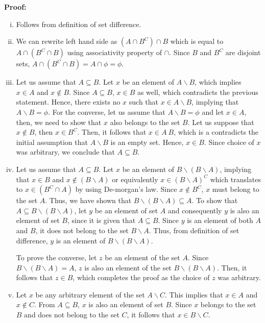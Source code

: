 \documentclass[a4paper,english,12pt]{article}
\begin{document}
\textbf{Proof: }
\begin{enumerate} [i)]
 \item Follows from definition of set difference.
 \item We can rewrite left hand side as $(A \cap B^{C}) \cap B$ which is equal to 
 $A \cap (B^{C} \cap B)$ using associativity property of $\cap$. Since $B$ and $B^{C}$ are disjoint sets, $A \cap (B^{C} \cap B) = A \cap \phi = \phi$. 
 \item Let us assume that $A \subseteq B$. Let $x$ be an element of $A \backslash B$, which implies $x \in A$ and $x \notin B$. Since $A \subseteq B$, $x \in B$ as well, which contradicts the previous  statement. Hence, there exists no $x$ such that $x \in A \backslash B$, implying that $A \backslash B = \phi$.  For the converse, let us assume that $A \backslash B = \phi$ and let $x \in A$, then, we need to show that $x$ also belongs to the set $B$. Let us suppose that $x \notin B$, then $x \in B^{C}$. Then, it follows that $x \in A \ B$, which is a contradicts the initial assumption that 
 $A \backslash B$ is an empty set. Hence, $x \in B$. Since choice of $x$ was arbitrary, we conclude that $A \subseteq B$.    
 \item Let us assume that $A \subseteq B$. Let $x$ be an element of $B \backslash (B \backslash A)$, implying that $x \in B$ and $x \notin (B \backslash A)$ or equivalently $x \in (B \backslash A)^{C}$
 which translates to $x \in (B^{C} \cap A)$ by using De-morgan's law. Since $x \notin B^{C}$, $x$ must belong to the set $A$. Thus, we have shown that $B \backslash (B \backslash A) \subseteq A$.
To show that $A \subseteq B \backslash (B \backslash A)$, let $y$ be an element of set $A$ and consequently $y$ is also an element of set $B$, since it is given that $A \subseteq B$. Since $y$ is an element of both $A$ and $B$, it does not belong to the set $B \backslash A$. Thus, from definition of set difference, $y$ is an element of $B \backslash (B \backslash A)$.

To prove the converse, let $z$ be an element of the set $A$. Since $B \backslash (B \backslash A) = A$, $z$ is also an element of the set $B \backslash (B \backslash A)$. Then, it follows that $z \in B$, which completes the proof as the choice of $z$ was arbitrary.
 
\item Let $x$ be any arbitrary element of the set $A \backslash C$. This implies that $x \in A$ and $x \notin C$. From $A \subseteq B$, $x $ is also an element of set $B$. Since $x$ belongs to the set $B$ and does not belong to the set $C$, it follows that $x \in B \backslash C$. 


\end{enumerate}
\end{document}
